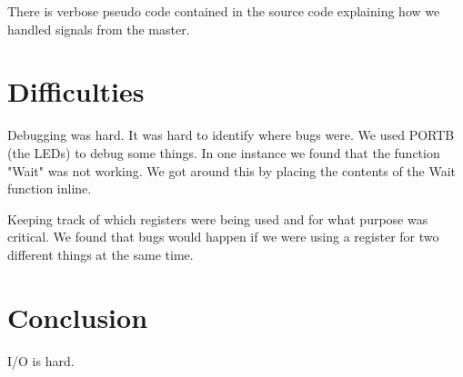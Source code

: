 \documentclass[12pt,letterpaper]{article}
\begin{document}
There is verbose pseudo code contained in the source code explaining how we handled signals from the master.

\section{Difficulties}

Debugging was hard. It was hard to identify where bugs were. We used PORTB (the LEDs) to debug some things. In one instance we found that the function "Wait" was not working. We got around this by placing the contents of the Wait function inline.

Keeping track of which registers were being used and for what purpose was critical. We found that bugs would happen if we were using a register for two different things at the same time.

\section{Conclusion}

I/O is hard.
\end{document}
